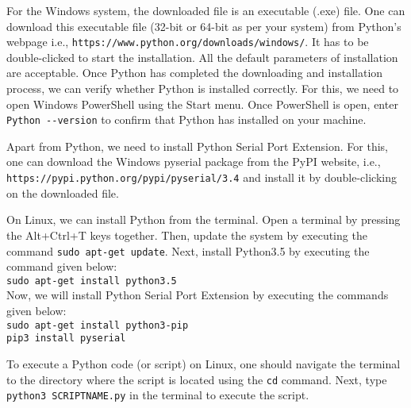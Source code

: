 For the Windows system, the downloaded file is an executable (.exe) file. One can download 
this executable file (32-bit or 64-bit as per your system) from Python's webpage i.e.,
{\tt https://www.python.org/downloads/windows/}. 
It has to be double-clicked to start the installation. All the default parameters of installation
are acceptable. Once Python has completed the downloading and installation process, we can verify whether
Python is installed correctly. For this, we need to open Windows PowerShell using the Start menu. 
Once PowerShell is open, enter {\tt Python -{}-version} to confirm that Python has installed on your machine. 

Apart from Python, we need to install Python Serial Port Extension. 
For this, one can download the
Windows pyserial package from the PyPI website, i.e., {\tt https://pypi.python.org/pypi/pyserial/3.4} and 
install it by double-clicking on the downloaded file. 

On Linux, we can install Python from the terminal. Open a terminal by 
pressing the Alt+Ctrl+T keys together. Then, update the system by executing the 
command {\tt sudo apt-get update}. Next, install Python3.5 by executing the command given below:\\
{\tt sudo apt-get install python3.5}\\
Now, we will install Python Serial Port Extension by executing the commands given below:\\ 
{\tt sudo apt-get install python3-pip \\
pip3 install pyserial}

To execute a Python code (or script) on Linux, one should 
navigate the terminal to the directory where the script is located using the {\tt cd} command.
Next, type {\tt python3 SCRIPTNAME.py} in the terminal to execute the script. 




